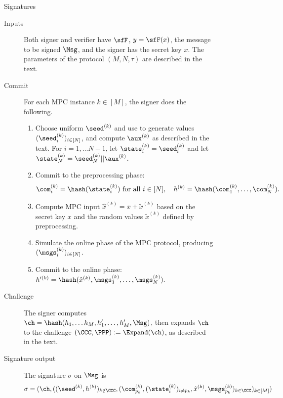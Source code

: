 \begin{figure}[p]
 \begin{minipage}[t]{1.1\textwidth}
 \begin{protocolbox}{\ttOWF Signatures}
 \begin{description}
    \item[Inputs] Both signer and verifier have $\sfF$, $y = \sfF(x)$, the
        message to be signed $\Msg$, and the signer has the secret key $x$.  The
            parameters of the protocol $(M, N, \tau)$ are described in the text.
    \item[Commit] For each MPC instance $k\in[M]$, the signer does the following.
    \begin{enumerate}
        \item Choose uniform $\seed^{(k)}$ and use  to generate values $(\seed^{(k)}_i)_{i \in [N]}$, and compute
        $\aux^{(k)}$ as described in the text.
        For $i=1,\ldots N-1$, let $\state^{(k)}_i = \seed^{(k)}_i$ and  let $\state^{(k)}_{N} = \seed^{(k)}_{N} || \aux^{(k)}$.
        \item Commit to the preprocessing phase:
        \begin{align*}
        \com^{(k)}_{i} = \hash(\state^{(k)}_i) \text{ for all } i\in [N], \quad
        h^{(k)} = \hash(\com^{(k)}_{1},\ldots,\com^{(k)}_{N}).
        \end{align*}						
        \item Compute MPC input $\hat{x}^{(k)} = x + \tilde{x}^{(k)}$ based on the secret key $x$ and the random values $\tilde{x}^{(k)}$ defined by preprocessing.
        \item Simulate the online phase of the MPC protocol, producing $(\msgs^{(k)}_i)_{i \in [N]}$.			
        \item Commit to the online phase:
        $
         h'^{(k)}= \hash(\hat{x}^{(k)}, \msgs_{1}^{(k)}, \ldots, \msgs_{N}^{(k)} ).
        $
    \end{enumerate}

    \item[Challenge]
    The signer computes $\ch = \hash(h_1, \ldots h_M, h_1', \ldots, h_M',
    \Msg)$, then expands $\ch$ to the challenge $(\CCC, \PPP) := \Expand(\ch)$, as described in the text.

    \item[Signature output]
    The signature $\sigma$ on $\Msg$ is
    \[
    \sigma = (\ch,
              ((\seed^{(k)}, h^{(k)} )_{k\not\in\CCC},
              ( \com^{(k)}_{p_k}, (\state^{(k)}_{i})_{i\neq p_k}, \hat{x}^{(k)}, \msgs_{p_k}^{(k)} )_{k\in\CCC})_{k\in[M]})
    \]


\end{description}
\end{protocolbox}
\end{minipage}
\end{figure}
